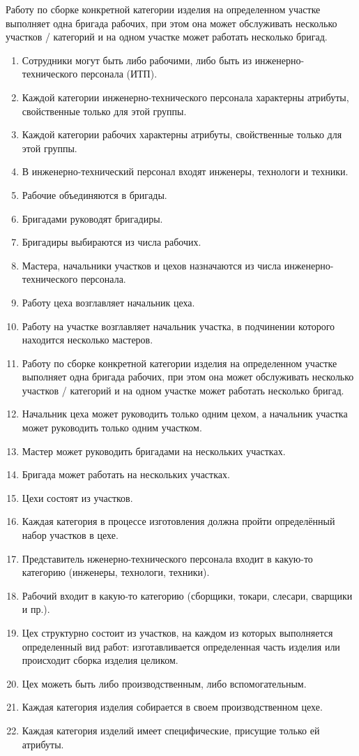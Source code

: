 Работу по сборке конкретной категории изделия на определенном участке выполняет одна бригада рабочих, при этом она может обслуживать несколько участков / категорий и на одном участке может работать несколько бригад.

\begin{enumerate}

    \item Сотрудники могут быть либо рабочими, либо быть из инженерно-технического персонала (ИТП).
    \item Каждой категории инженерно-технического персонала характерны атрибуты, свойственные только для этой группы.
    \item Каждой категории рабочих характерны атрибуты, свойственные только для этой группы.
    \item В инженерно-технический персонал входят инженеры, технологи и техники.
    \item Рабочие объединяются в бригады.
    \item Бригадами руководят бригадиры.
    \item Бригадиры выбираются из числа рабочих.
    \item Мастера, начальники участков и цехов назначаются из числа инженерно-технического персонала.
    \item Работу цеха возглавляет начальник цеха.
    \item Работу на участке возглавляет начальник участка, в подчинении которого находится несколько мастеров.
    \item Работу по сборке конкретной категории изделия на определенном участке выполняет одна бригада рабочих, при этом она может обслуживать несколько участков / категорий и на одном участке может работать несколько бригад.
    \item Начальник цеха может руководить только одним цехом, а начальник участка может руководить только одним участком.
    \item Мастер может руководить бригадами на нескольких участках.
    \item Бригада может работать на нескольких участках.
    \item Цехи состоят из участков.
    \item Каждая категория в процессе изготовления должна пройти определённый набор участков в цехе.

    \item Представитель нженерно-технического персонала входит в какую-то категорию (инженеры, технологи, техники).
    \item Рабочий входит в какую-то категорию (сборщики, токари, слесари, сварщики и пр.).
    \item Цех структурно состоит из участков, на каждом из которых выполняется определенный вид работ: изготавливается определенная часть изделия или происходит сборка изделия целиком.
    \item Цех можеть быть либо производственным, либо вспомогательным.
    \item Каждая категория изделия собирается в своем производственном цехе.
    \item Каждая категория изделий имеет специфические, присущие только ей атрибуты.


\end{enumerate}
